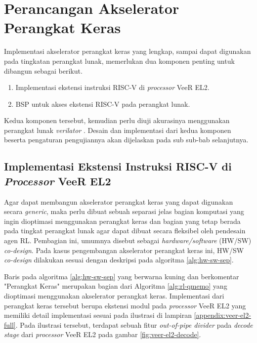 \section{Perancangan Akselerator Perangkat Keras}
\label{sec:perancangan-akselerator}

Implementasi akselerator perangkat keras yang lengkap, sampai dapat digunakan pada tingkatan perangkat lunak, memerlukan dua komponen penting untuk dibangun sebagai berikut.

\begin{enumerate}
	\item Implementasi ekstensi instruksi RISC-V di \textit{processor} VeeR EL2.
	\item \ac{BSP} untuk akses ekstensi RISC-V pada perangkat lunak.
\end{enumerate}

Kedua komponen tersebut, kemudian perlu diuji akurasinya menggunakan perangkat lunak \textit{verilator} \parencite{verilator2024github}. Desain dan implementasi dari kedua komponen beserta pengaturan pengujiannya akan dijelaskan pada sub sub-bab selanjutnya.

\subsection{Implementasi Ekstensi Instruksi RISC-V di \textit{Processor} VeeR EL2}

Agar dapat membangun akselerator perangkat keras yang dapat digunakan secara \textit{generic}, maka perlu dibuat sebuah separasi jelas bagian komputasi yang ingin dioptimasi menggunakan perangkat keras dan bagian yang tetap berada pada tingkat perangkat lunak agar dapat dibuat secara fleksibel oleh pendesain agen \ac{RL}. Pembagian ini, umumnya disebut sebagai \textit{hardware/software} (HW/SW) \textit{co-design}. Pada kasus pengembangan akselerator perangkat keras ini, HW/SW \textit{co-design} dilakukan sesuai dengan deskripsi pada algoritma \ref{alg:hw-sw-sep}.

Baris pada algoritma \ref{alg:hw-sw-sep} yang berwarna kuning dan berkomentar "Perangkat Keras" merupakan bagian dari Algoritma \ref{alg:rl-qmemo} yang dioptimasi menggunakan akselerator perangkat keras. Implementasi dari perangkat keras tersebut berupa ekstensi modul pada \textit{processor} VeeR EL2 yang memiliki detail implementasi sesuai pada ilustrasi di lampiran \ref{appendix:veer-el2-full}. Pada ilustrasi tersebut, terdapat sebuah fitur \textit{out-of-pipe divider} pada \textit{decode stage} dari \textit{processor} VeeR EL2 pada gambar \ref{fig:veer-el2-decode}.

